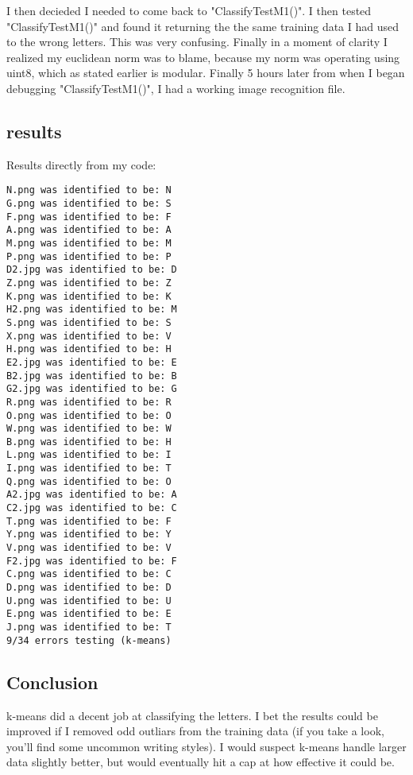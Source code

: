 \documentclass[a4paper]{article}
\begin{document}
I then decieded I needed to come back to "ClassifyTestM1()". I then tested "ClassifyTestM1()" and found it returning the the same training data I had used to the wrong letters. This was very confusing. Finally in a moment of clarity I realized my euclidean norm was to blame, because my norm was operating using uint8, which as stated earlier is modular. Finally 5 hours later from when I began debugging "ClassifyTestM1()", I had a working image recognition file.

\subsection{results}

Results directly from my code:

\begin{verbatim}
N.png was identified to be: N
G.png was identified to be: S
F.png was identified to be: F
A.png was identified to be: A
M.png was identified to be: M
P.png was identified to be: P
D2.jpg was identified to be: D
Z.png was identified to be: Z
K.png was identified to be: K
H2.png was identified to be: M
S.png was identified to be: S
X.png was identified to be: V
H.png was identified to be: H
E2.jpg was identified to be: E
B2.jpg was identified to be: B
G2.jpg was identified to be: G
R.png was identified to be: R
O.png was identified to be: O
W.png was identified to be: W
B.png was identified to be: H
L.png was identified to be: I
I.png was identified to be: T
Q.png was identified to be: O
A2.jpg was identified to be: A
C2.jpg was identified to be: C
T.png was identified to be: F
Y.png was identified to be: Y
V.png was identified to be: V
F2.jpg was identified to be: F
C.png was identified to be: C
D.png was identified to be: D
U.png was identified to be: U
E.png was identified to be: E
J.png was identified to be: T
9/34 errors testing (k-means)
\end{verbatim}

\subsection{Conclusion}

k-means did a decent job at classifying the letters. I bet the results could be improved if I removed odd outliars from the training data (if you take a look, you'll find some uncommon writing styles). I would suspect k-means handle larger data slightly better, but would eventually hit a cap at how effective it could be.
\end{document}
